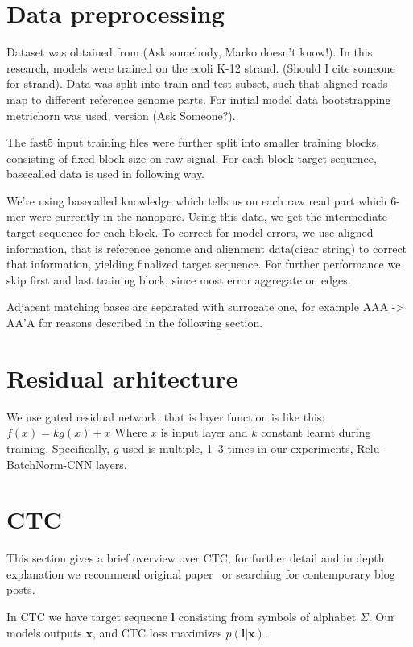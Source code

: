 \documentclass[times, utf8, seminar, numeric]{fer}
\begin{document}
\section{Data preprocessing}

Dataset was obtained from (Ask somebody, Marko doesn't know!). In this research, models were trained on the ecoli K-12 strand. (Should I cite someone for strand). Data was split into train and test subset, such that aligned reads map to different reference genome parts. For initial model data bootstrapping metrichorn was used, version (Ask Someone?).

The fast5 input training files were further split into smaller training blocks, consisting of fixed block size on raw signal. For each block target sequence, basecalled data is used in following way.

We're using basecalled knowledge which tells us on each raw read part which 6-mer were currently in the nanopore. Using this data, we get the intermediate target sequence for each block. To correct for model errors, we use aligned information, that is reference genome and alignment data(cigar string) to correct that information, yielding finalized target sequence. For further performance we skip first and last training block, since most error aggregate on edges.

Adjacent matching bases are separated with surrogate one, for example AAA -> AA'A for reasons described in the following section.
\section{Residual arhitecture}

We use gated residual network, that is layer function is like this: $f(x) = k g(x) + x$ Where $x$ is input layer and $k$ constant learnt during training. Specifically, $g$ used is multiple, 1--3 times in our experiments, Relu-BatchNorm-CNN layers.

\section{CTC}

This section gives a brief overview over CTC, for further detail and in depth explanation we recommend original paper~\cite{graves2006connectionist} or searching for contemporary blog posts.

In CTC we have target sequecne $\mathbf{l}$ consisting from symbols of alphabet $\Sigma$. Our models outputs $\mathbf{x}$, and CTC loss maximizes $p(\mathbf{l}|\mathbf{x})$.
\end{document}
